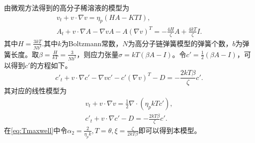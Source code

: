 	由微观方法得到的高分子稀溶液的模型为 \cite{le2009multiscale,larson1999structure}
	\begin{eqnarray*}
		v_t + v \cdot \nabla v = \eta_p (H A - KT I), \\
		A_t + v \cdot \nabla A - \nabla v A - A(\nabla v)^T  = -\frac{4 H}{\zeta} A+ \frac{4kT}{\zeta} I.
	\end{eqnarray*}
	其中$H = \frac{3kT}{Nb^2}$.其中$k$为Boltzmann常数，$N$为高分子链弹簧模型的弹簧个数，$b$为弹簧长度。取$\beta = \frac{H}{kT} = \frac{3}{Nb^2}$，则应力张量$\sigma = k T(\beta A-I)$。令$c'=\frac{1}{2}(\beta A-I)$，可以得到$c'$的方程如下。
	\begin{equation}\label{eq:MicroUCM}
		c'_t + v \cdot \nabla c'- \nabla v c' - c'(\nabla v)^T -  D  = -\frac{2 kT \beta}{\zeta} c'.
	\end{equation}
	其对应的线性模型为
	\begin{eqnarray*}
		v_t + v \cdot \nabla v = \frac{1}{2} \nabla \cdot (\eta_p kT c'), \\
		c'_t + v \cdot \nabla c' -  D  = -\frac{2 kT \beta}{\zeta} c'.
	\end{eqnarray*}
	在\eqref{eq:Tmaxwell}中令$\alpha_2 = \frac{2}{\eta_p k}, T = \theta,\xi = \frac{\zeta}{2 kT \beta}$即可以得到本模型。

